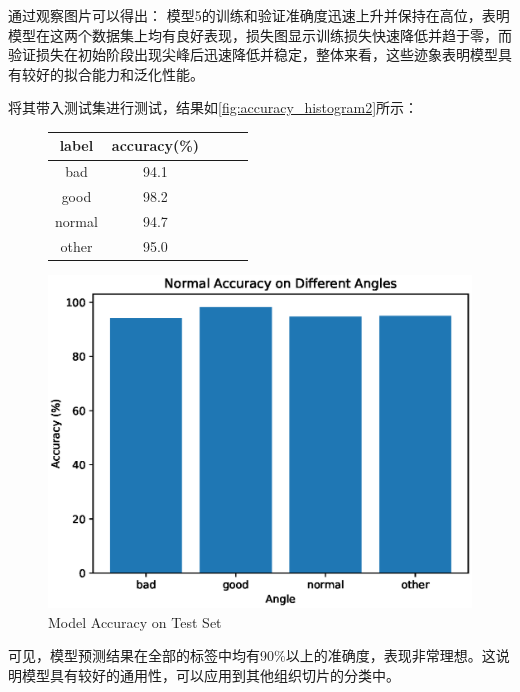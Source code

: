 通过观察图片可以得出：
模型5的训练和验证准确度迅速上升并保持在高位，表明模型在这两个数据集上均有良好表现，损失图显示训练损失快速降低并趋于零，而验证损失在初始阶段出现尖峰后迅速降低并稳定，整体来看，这些迹象表明模型具有较好的拟合能力和泛化性能。

将其带入测试集进行测试，结果如\autoref{fig:accuracy_histogram2}所示：

\begin{figure}[H]
    \begin{minipage}{0.45\textwidth}
        \centering
        \begin{tabular}{ccccc}
            \toprule
            label & accuracy(\%) \\
            \midrule
            bad & 94.1 \\
            good & 98.2 \\
            normal & 94.7 \\
            other & 95.0 \\
            \bottomrule
        \end{tabular}
        \label{tab:model_accuracy3}
    \end{minipage}
    \begin{minipage}{0.45\textwidth}
        \centering
        \includegraphics[width=\textwidth]{./fig/assistplot/angle_accuracy2.eps}
        \caption{Model Accuracy on Test Set}
        \label{fig:accuracy_histogram2}
    \end{minipage}
\end{figure}

可见，模型预测结果在全部的标签中均有90\%以上的准确度，表现非常理想。这说明模型具有较好的通用性，可以应用到其他组织切片的分类中。




\FloatBarrier